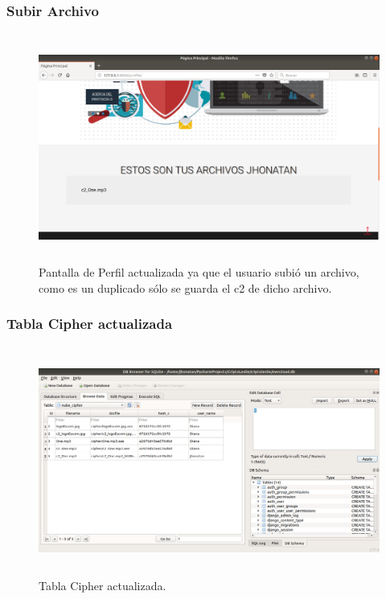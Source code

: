 \subsubsection{Subir Archivo}

			\begin{figure}[H]
			\centering
			\includegraphics[width=14cm, height=7.5cm]{./images/Implementacion/SubirArchivoOtroUsuario.png}
			\caption{Pantalla de Perfil actualizada ya que el usuario subió un archivo, como es un duplicado sólo se guarda el c2 de dicho archivo.}
			\label{fig:6-1-21} 
			\end{figure}

\subsubsection{Tabla Cipher actualizada}

			\begin{figure}[H]
			\centering
			\includegraphics[width=14cm, height=7.5cm]{./images/Implementacion/TablaCipherOtroUsuario.png}
			\caption{Tabla Cipher actualizada.}
			\label{fig:6-1-22} 
			\end{figure}

